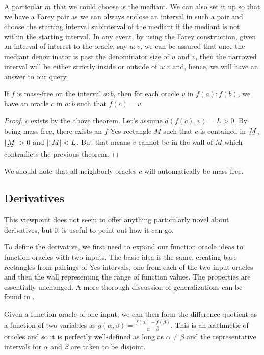 \documentclass[12pt]{article}
\begin{document}
A particular $m$ that we could choose is the mediant. We can also set it up so that we have a Farey pair as we can always enclose an interval in such a pair and choose the starting interval subinterval of the mediant if the mediant is not within the starting interval. In any event, by using the Farey construction, given an interval of interest to the oracle, say $u:v$, we can be assured that once the mediant denominator is past the denominator size of $u$ and $v$, then the narrowed interval will be either strictly inside or outside of $u:v$ and, hence, we will have an answer to our query. 

\begin{corollary}
If $f$ is mass-free on the interval $a:b$, then for each oracle $v$ in $f(a):f(b)$, we have an oracle $c$ in $a:b$ such that $f(c)=v$.
\end{corollary}

\begin{proof}
$c$ exists by the above theorem. Let's assume $d(f(c), v) = L > 0$. By being mass free, there exists an $f$-Yes rectangle $M$ such that $c$ is contained in $\base{M}$, $|\base{M}| > 0$ and $|\wall{M}| < L$. But that means $v$ cannot be in the wall of $M$ which contradicts the previous theorem. 
\end{proof}
    
We should note that all neighborly oracles $c$ will automatically be mass-free. 

\subsection{Derivatives}

This viewpoint does not seem to offer anything particularly novel about derivatives, but it is useful to point out how it can go. 

To define the derivative, we first need to expand our function oracle ideas to function oracles with two inputs. The basic idea is the same, creating base rectangles from pairings of Yes intervals, one from each of the two input oracles and then the wall representing the range of function values. The properties are essentially unchanged. A more thorough discussion of generalizations can be found in \cite{taylor23metric}.

Given a function oracle of one input, we can then form the difference quotient as a function of two variables as $g(\alpha, \beta) = \frac{ f(\alpha) - f(\beta) }{\alpha - \beta}$. This is an arithmetic of oracles and so it is perfectly well-defined as long as $\alpha \neq \beta$ and the representative intervals for $\alpha$ and $\beta$ are taken to be disjoint. 
\end{document}
